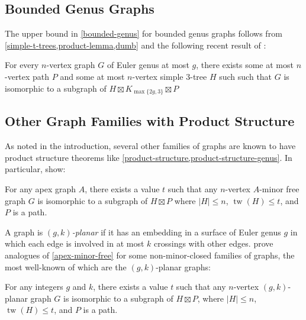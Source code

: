 \documentclass[kpfonts]{patmorin}
\newcommand{\defin}[1]{\emph{\color{brightmaroon}#1}}
\DeclareMathOperator{\tw}{tw}
\theoremstyle{named}
\begin{document}
\subsection{Bounded Genus Graphs}


The upper bound in \cref{bounded-genus} for bounded genus graphs follows from \cref{simple-t-trees,product-lemma,dumb} and the following recent result of \citet{distel.hickingbotham.ea:improved}:

\begin{thm} \label{product-structure-genus}
    For every $n$-vertex graph $G$ of Euler genus at most $g$, there exists some at most $n$-vertex path $P$ and some at most $n$-vertex simple $3$-tree $H$ such such that $G$ is isomorphic to a subgraph of $H\boxtimes K_{\max\{2g,3\}}\boxtimes P$
\end{thm}

\subsection{Other Graph Families with Product Structure}

As noted in the introduction, several other families of graphs are known to have product structure theorems like \cref{product-structure,product-structure-genus}.  In particular, \citet{dujmovic.joret.ea:planar} show:

\begin{thm}\label{apex-minor-free}
    For any apex graph $A$, there exists a value $t$ such that any $n$-vertex $A$-minor free graph $G$ is isomorphic to a subgraph of $H\boxtimes P$ where $|H|\le n$, $\tw(H)\le t$, and $P$ is a path.
\end{thm}

A graph is \defin{$(g,k)$-planar} if it has an embedding in a surface of Euler genus $g$ in which each edge is involved in at most $k$ crossings with other edges.  \citet{dujmovic.morin.ea:structure} prove analogues of \cref{apex-minor-free} for some non-minor-closed families of graphs, the most well-known of which are the $(g,k)$-planar graphs:

\begin{thm}\label{gk-planar}
    For any integers $g$ and $k$, there exists a value $t$ such that any $n$-vertex $(g,k)$-planar graph $G$ is isomorphic to a subgraph of $H\boxtimes P$, where $|H|\le n$, $\tw(H)\le t$, and $P$ is a path.
\end{thm}
\end{document}

